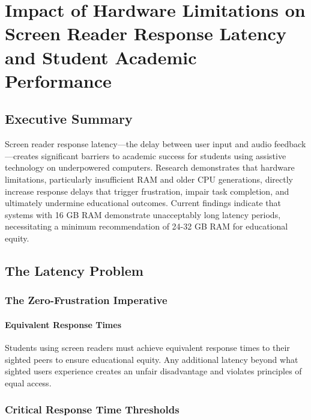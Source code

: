 \chapter{Impact of Hardware Limitations on Screen Reader Response Latency and Student Academic Performance}\label{vision-assistive-technology-laptop-computer-requirements}

\section{Executive Summary}\label{executive-summary}

Screen reader response latency—the delay between user input and audio feedback—creates significant barriers to academic success for students using assistive technology on underpowered computers. Research demonstrates that hardware limitations, particularly insufficient RAM and older CPU generations, directly increase response delays that trigger frustration, impair task completion, and ultimately undermine educational outcomes. Current findings indicate that systems with 16 GB RAM demonstrate unacceptably long latency periods, necessitating a minimum recommendation of 24-32 GB RAM for educational equity.

\section{The Latency Problem}\label{the-latency-problem}

\subsection{The Zero-Frustration Imperative}\label{the-zero-frustration-imperative}

\subsubsection{Equivalent Response Times}

Students using screen readers must achieve equivalent response times to their sighted peers to ensure educational equity. Any additional latency beyond what sighted users experience creates an unfair disadvantage and violates principles of equal access.

\subsection{Critical Response Time Thresholds}\label{critical-response-time-thresholds}

